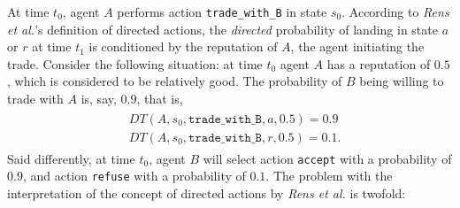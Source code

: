At time $t_0$, agent $A$ performs action \texttt{trade\_with\_B} in state $s_0$. According to \textit{Rens et al.}'s definition of directed actions, the \textit{directed} probability of landing in state $a$ or $r$ at time $t_1$ is conditioned by the reputation of $A$, the agent initiating the trade. 
Consider the following situation: at time $t_0$ agent $A$ has a reputation of $0.5$, which is considered to be relatively good. The probability of $B$ being willing to trade with $A$ is, say, $0.9$, that is,
    \begin{align}
    \label{eq:transitions}
    \begin{split}
        &DT(A, s_0, \texttt{trade\_with\_B}, a, 0.5) = 0.9  \\&  DT(A, s_0, \texttt{trade\_with\_B}, r, 0.5) = 0.1. 
    \end{split}
    \end{align}
Said differently, at time $t_0$, agent $B$ will select action \texttt{accept} with a probability of $0.9$, and action \texttt{refuse} with a probability of $0.1$. 
The problem with the interpretation of the concept of directed actions by \textit{Rens et al.} is twofold:
